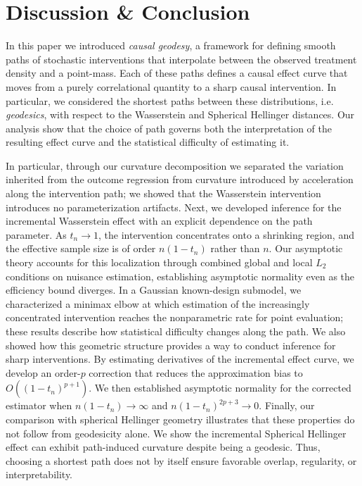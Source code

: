 \documentclass[11pt,twoside]{article}
\theoremstyle{definition}
\theoremstyle{remark}
\begin{document}
\section{Discussion \& Conclusion} \label{conclusion_section}

In this paper we introduced {\em causal geodesy}, a framework for defining smooth paths of stochastic interventions that interpolate between the observed treatment density and a point-mass. Each of these paths defines a causal effect curve that moves from a purely correlational quantity to a sharp causal intervention. In particular, we considered the shortest paths between these distributions, i.e. \textit{geodesics}, with respect to the Wasserstein and Spherical Hellinger distances. Our analysis show that the choice of path governs both the interpretation of the resulting effect curve and the statistical difficulty of estimating it.

In particular, through our curvature decomposition we separated the variation inherited from the outcome regression from curvature introduced by acceleration along the intervention path; we showed that the Wasserstein intervention introduces no parameterization artifacts. Next, we developed inference for the incremental Wasserstein effect with an explicit dependence on the path parameter. As $t_n\to1$, the intervention concentrates onto a shrinking region, and the effective sample size is of order $n(1-t_n)$ rather than $n$. Our asymptotic theory accounts for this localization through combined global and local $L_2$ conditions on nuisance estimation, establishing asymptotic normality even as the efficiency bound diverges. In a Gaussian known-design submodel, we characterized a minimax elbow at which estimation of the increasingly concentrated intervention reaches the nonparametric rate for point evaluation; these results describe how statistical difficulty changes along the path. We also showed how this geometric structure provides a way to conduct inference for sharp interventions. By estimating derivatives of the incremental effect curve, we develop an order-$p$ correction that reduces the approximation bias to $O((1-t_n)^{p+1})$. We then established asymptotic normality for the corrected estimator when $n(1-t_n)\to\infty$ and $n(1-t_n)^{2p+3}\to 0$. Finally, our comparison with spherical Hellinger geometry illustrates that these properties do not follow from geodesicity alone. We show the incremental Spherical Hellinger effect can exhibit path-induced curvature despite being a geodesic. Thus, choosing a shortest path does not by itself ensure favorable overlap, regularity, or interpretability.
\end{document}
